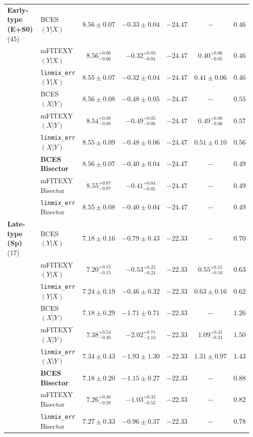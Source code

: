 \documentclass[preprint2]{emulateapj}
\begin{document}
\begin{table}
\begin{tabular}{llccccc}
{\bf Early-type (E+S0)} (45) & BCES $(Y|X)$    & $8.56 \pm 0.07$ & $-0.33 \pm 0.04$ & $-24.47$ & $-$    & $0.46$ \\
                             & mFITEXY $(Y|X)$ & $8.56^{+0.06}_{-0.06}$ & $-0.32^{+0.03}_{-0.04}$ & $-24.47$ & $0.40^{+0.06}_{-0.05}$ & $0.46$ \\
                             & {\tt linmix\_err} $(Y|X)$  & $8.55 \pm 0.07$ & $-0.32 \pm 0.04$ & $-24.47$ & $0.41 \pm 0.06$ & $0.46$ \\ [0.5em]
                             & BCES $(X|Y)$    & $8.56 \pm 0.08$ & $-0.48 \pm 0.05$ & $-24.47$ & $-$    & $0.55$ \\
                             & mFITEXY $(X|Y)$ & $8.54^{+0.08}_{-0.08}$ & $-0.49^{+0.05}_{-0.06}$ & $-24.47$ & $0.49^{+0.08}_{-0.06}$ & $0.57$\\
                             & {\tt linmix\_err} $(X|Y)$  & $8.55 \pm 0.09$ & $-0.48 \pm 0.06$ & $-24.47$ & $0.51 \pm 0.10$ & $0.56$ \\ [0.5em]
                             & {\bf BCES Bisector}& $\boldsymbol{8.56 \pm 0.07}$ & $\boldsymbol{-0.40 \pm 0.04}$ & $\boldsymbol{-24.47}$ & $-$    & $\boldsymbol{0.49}$ \\
                             & mFITEXY Bisector   & $8.55^{+0.07}_{-0.07}$ & $-0.41^{+0.04}_{-0.05}$ & $-24.47$ & $-$    & $0.49$ \\
                             & {\tt linmix\_err} Bisector    & $8.55 \pm 0.08$ & $-0.40 \pm 0.04$ & $-24.47$ & $-$    & $0.49$ \\ [0.5em]

{\bf Late-type (Sp)} (17) & BCES $(Y|X)$    & $7.18 \pm 0.16$ & $-0.79 \pm 0.43$ & $-22.33$ & $-$    & $0.70$ \\
                          & mFITEXY $(Y|X)$    & $7.20^{+0.15}_{-0.15}$ & $-0.53^{+0.22}_{-0.24}$ & $-22.33$ & $0.55^{+0.15}_{-0.10}$ & $0.63$ \\
                          & {\tt linmix\_err} $(Y|X)$  & $7.24 \pm 0.19$ & $-0.46 \pm 0.32$ & $-22.33$ & $0.63 \pm 0.16$ & $0.62$ \\ [0.5em]
                          & BCES $(X|Y)$    & $7.18 \pm 0.29$ & $-1.71 \pm 0.71$ & $-22.33$ & $-$    & $1.26$ \\
                          & mFITEXY $(X|Y)$    & $7.38^{+0.54}_{-0.36}$ & $-2.02^{+0.71}_{-2.13}$ & $-22.33$ & $1.09^{+0.41}_{-0.24}$ & $1.50$ \\
                          & {\tt linmix\_err} $(X|Y)$  & $7.34 \pm 0.43$ & $-1.93 \pm 1.30$ & $-22.33$ & $1.31 \pm 0.97$ & $1.43$ \\ [0.5em]
                          & {\bf BCES Bisector}& $\boldsymbol{7.18 \pm 0.20}$ & $\boldsymbol{-1.15 \pm 0.27}$ & $\boldsymbol{-22.33}$ & $-$    & $\boldsymbol{0.88}$ \\
                          & mFITEXY Bisector   & $7.26^{+0.40}_{-0.28}$ & $-1.03^{+0.33}_{-0.52}$ & $-22.33$ & $-$    & $0.82$ \\
                          & {\tt linmix\_err} Bisector & $7.27 \pm 0.33$ & $-0.96 \pm 0.37$ & $-22.33$ & $-$    & $0.78$ \\ [0.5em]


\end{tabular}
\end{table}
\end{document}
